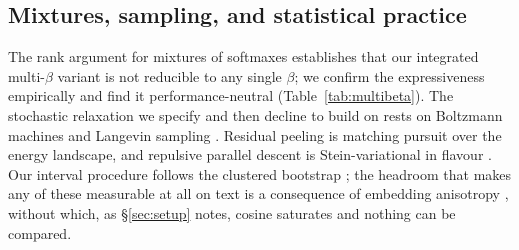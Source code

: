 \subsection{Mixtures, sampling, and statistical practice}

The rank argument for mixtures of softmaxes \citep{yang2018softmax} establishes that our
integrated multi-$\beta$ variant is not reducible to any single $\beta$; we confirm the
expressiveness empirically and find it performance-neutral (Table~\ref{tab:multibeta}).
The stochastic relaxation we specify and then decline to build on rests on Boltzmann machines
\citep{ackley1985boltzmann} and Langevin sampling \citep{welling2011sgld}. Residual peeling
is matching pursuit \citep{mallat1993matching} over the energy landscape, and repulsive
parallel descent is Stein-variational in flavour \citep{liu2016svgd}. Our interval procedure
follows the clustered bootstrap \citep{cameron2008bootstrap}; the headroom that makes any of
these measurable at all on text is a consequence of embedding anisotropy
\citep{ethayarajh2019contextual,gao2019representation}, without which, as
\S\ref{sec:setup} notes, cosine saturates and nothing can be compared.
